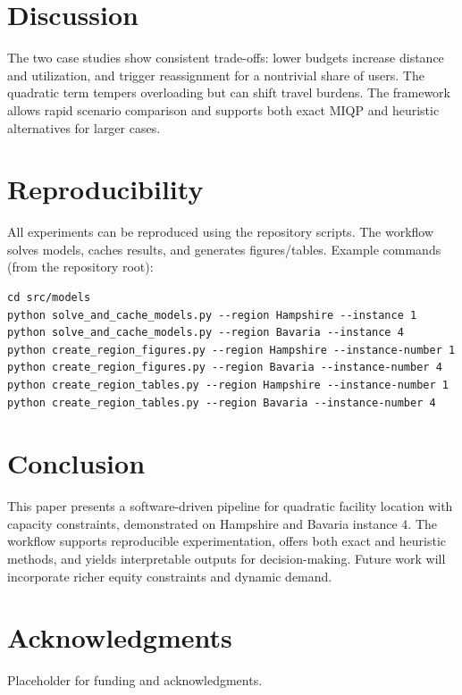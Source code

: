\documentclass[11pt]{article}
\begin{document}
\section{Discussion}
The two case studies show consistent trade-offs: lower budgets increase distance and utilization, and trigger reassignment for a nontrivial share of users. The quadratic term tempers overloading but can shift travel burdens. The framework allows rapid scenario comparison and supports both exact MIQP and heuristic alternatives for larger cases.

\section{Reproducibility}
All experiments can be reproduced using the repository scripts. The workflow solves models, caches results, and generates figures/tables. Example commands (from the repository root):
\begin{verbatim}
cd src/models
python solve_and_cache_models.py --region Hampshire --instance 1
python solve_and_cache_models.py --region Bavaria --instance 4
python create_region_figures.py --region Hampshire --instance-number 1
python create_region_figures.py --region Bavaria --instance-number 4
python create_region_tables.py --region Hampshire --instance-number 1
python create_region_tables.py --region Bavaria --instance-number 4
\end{verbatim}

\section{Conclusion}
This paper presents a software-driven pipeline for quadratic facility location with capacity constraints, demonstrated on Hampshire and Bavaria instance 4. The workflow supports reproducible experimentation, offers both exact and heuristic methods, and yields interpretable outputs for decision-making. Future work will incorporate richer equity constraints and dynamic demand.

\section*{Acknowledgments}
Placeholder for funding and acknowledgments.



\end{document}
